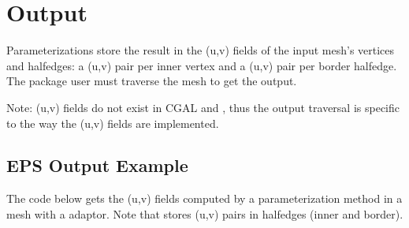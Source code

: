 \section{Output}

Parameterizations store the result in the (u,v) fields of the input mesh's vertices
and halfedges: a (u,v) pair per inner vertex and a (u,v) pair per border halfedge.
The package user must traverse the mesh to get the output.

Note: (u,v) fields do not exist in CGAL  and
, thus
the output traversal is specific to the way the (u,v) fields are implemented.

\subsection{EPS Output Example}

The code below gets the (u,v) fields computed by a parameterization method
in a  mesh with a  adaptor.
Note that  stores (u,v) pairs in halfedges (inner and border).

